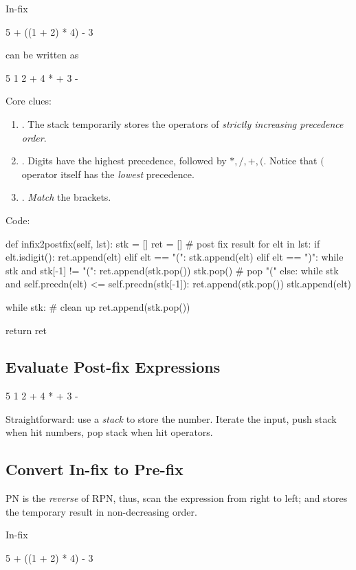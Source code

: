 In-fix
\begin{python}
5 + ((1 + 2) * 4) - 3
\end{python}

can be written as
\begin{python}
5 1 2 + 4 * + 3 - 
\end{python}
Core clues:
\begin{enumerate}
\item {}. The stack temporarily stores the operators of \textit{strictly increasing precedence order}.
\item {}. Digits have the highest precedence, followed by $*, /, +, ($. Notice that $($ operator itself has the \textit{lowest} precedence.
\item {}. \textit{Match} the brackets. 
\end{enumerate}
Code:
\begin{python}
def infix2postfix(self, lst):
  stk = []
  ret = []  # post fix result
  for elt in lst:
    if elt.isdigit():
      ret.append(elt)
    elif elt == "(":
      stk.append(elt)
    elif elt == ")":
      while stk and stk[-1] != "(":
        ret.append(stk.pop())
      stk.pop()  # pop "("
    else:
      while stk and self.precdn(elt) <= self.precdn(stk[-1]):
        ret.append(stk.pop())
      stk.append(elt)

  while stk:  # clean up 
    ret.append(stk.pop())

  return ret
\end{python}

\subsection{Evaluate Post-fix Expressions}
\begin{python}
5 1 2 + 4 * + 3 - 
\end{python}
Straightforward: use a \textit{stack} to store the number. Iterate the input, push
stack when hit numbers, pop stack when hit operators.

\subsection{Convert In-fix to Pre-fix}
PN is the \textit{reverse} of RPN, thus, scan the expression from right to left; and  stores the temporary result in non-decreasing order. 


In-fix
\begin{python}
5 + ((1 + 2) * 4) - 3
\end{python}

